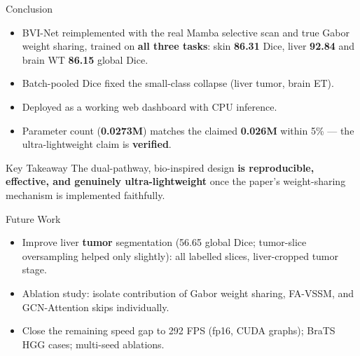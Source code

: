 \documentclass[11pt]{beamer}
\begin{document}
\begin{frame}{Conclusion}
    \begin{itemize}
        \item BVI-Net reimplemented with the real Mamba selective scan and true
              Gabor weight sharing, trained on \textbf{all three tasks}: skin
              \textbf{86.31} Dice, liver \textbf{92.84} and brain WT \textbf{86.15}
              global Dice.

        \medskip

        \item Batch-pooled Dice fixed the small-class collapse (liver tumor, brain ET).

        \medskip

        \item Deployed as a working web dashboard with CPU inference.

        \medskip

        \item Parameter count (\textbf{0.0273M}) matches the claimed
              \textbf{0.026M} within 5\% --- the ultra-lightweight claim is
              \textbf{verified}.
    \end{itemize}

    \bigskip

    \begin{block}{Key Takeaway}
    The dual-pathway, bio-inspired design \textbf{is reproducible, effective,
    and genuinely ultra-lightweight} once the paper's weight-sharing
    mechanism is implemented faithfully.
    \end{block}
\end{frame}


\begin{frame}{Future Work}
    \begin{itemize}
        \item Improve liver \textbf{tumor} segmentation (56.65 global Dice; tumor-slice
              oversampling helped only slightly): all labelled slices, liver-cropped tumor stage.
        \item Ablation study: isolate contribution of Gabor weight sharing,
              FA-VSSM, and GCN-Attention skips individually.
        \item Close the remaining speed gap to 292 FPS (fp16, CUDA graphs); BraTS HGG cases;
              multi-seed ablations.
    \end{itemize}
\end{frame}
\end{document}
